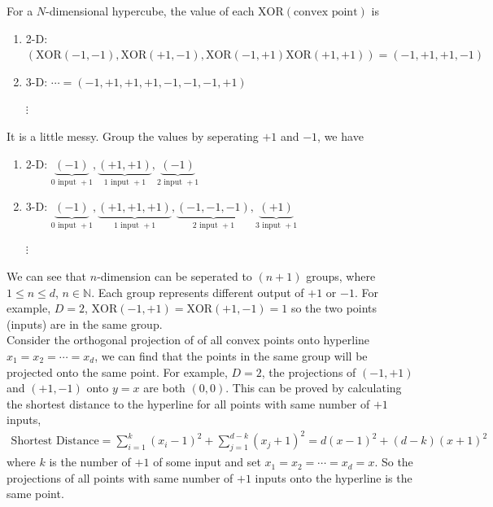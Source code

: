 \documentclass[12pt]{article}
\newcommand{\ParTh}[1]{\left(#1\right)}
\begin{document}
For a $N$-dimensional hypercube, the value of each $\text{XOR}\ParTh{\text{convex point}}$ is
\begin{enumerate}
	\item 2-D: $\ParTh{\text{XOR}\ParTh{-1,-1},\text{XOR}\ParTh{+1,-1},\text{XOR}\ParTh{-1,+1}\text{XOR}\ParTh{+1,+1}}=\ParTh{-1,+1,+1,-1}$
	\item 3-D: $\cdots=\ParTh{-1,+1,+1,+1,-1,-1,-1,+1}$
	\item[$\vdots$]
\end{enumerate}
It is a little messy. Group the values by seperating $+1$ and $-1$, we have
\begin{enumerate}
	\item 2-D: $\underbrace{\ParTh{-1}}_{0\text{ input } +1},\underbrace{\ParTh{+1,+1}}_{1\text{ input } +1},\underbrace{\ParTh{-1}}_{2\text{ input } +1}$
	\item 3-D: $\underbrace{\ParTh{-1}}_{0\text{ input } +1},\underbrace{\ParTh{+1,+1,+1}}_{1\text{ input } +1},\underbrace{\ParTh{-1,-1,-1}}_{2\text{ input } +1},\underbrace{\ParTh{+1}}_{3\text{ input } +1}$
	\item[$\vdots$]
\end{enumerate}
We can see that $n$-dimension can be seperated to $\ParTh{n+1}$ groups, where $1\leq n\leq d$, $n\in\mathbb{N}$. Each group represents different output of $+1$ or $-1$. For example, $D=2$, $\text{XOR}\ParTh{-1,+1}=\text{XOR}\ParTh{+1,-1}=1$ so the two points (inputs) are in the same group. \\

Consider the orthogonal projection of of all convex points onto hyperline $x_1=x_2=\cdots=x_d$, we can find that the points in the same group will be projected onto the same point. For example, $D=2$, the projections of $\ParTh{-1,+1}$ and $\ParTh{+1,-1}$ onto $y=x$ are both $\ParTh{0,0}$. This can be proved by calculating the shortest distance to the hyperline for all points with same number of $+1$ inputs,
\begin{align}
\text{Shortest Distance}=\sum_{i=1}^{k}\ParTh{x_i-1}^2+\sum_{j=1}^{d-k}\ParTh{x_j+1}^2=d\ParTh{x-1}^2+\ParTh{d-k}\ParTh{x+1}^2
\end{align}
where $k$ is the number of $+1$ of some input and set $x_1=x_2=\cdots=x_d=x$. So the projections of all points with same number of $+1$ inputs onto the hyperline is the same point.\\
\end{document}
